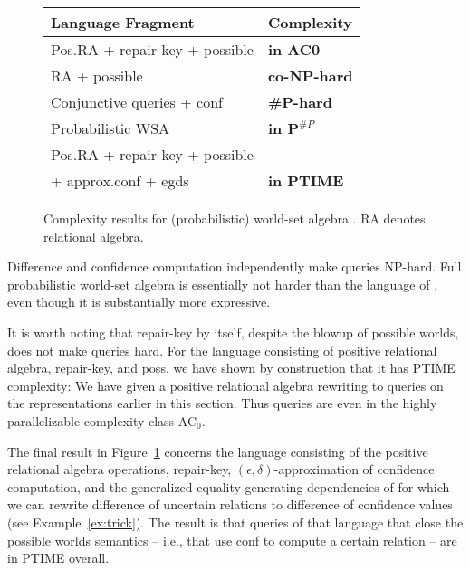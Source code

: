 \begin{figure}
\begin{center}
\begin{tabular}{|l|l|}
\hline
Language Fragment & Complexity \\
\hline
\hline
Pos.RA + repair-key + possible &
{\bf in AC0}
\\[.3ex]
RA + possible & {\bf co-NP-hard}
\\[.3ex]
Conjunctive queries + conf & {\bf \#P-hard}
\\[.3ex]
Probabilistic WSA & {\bf in ${\mathbf P^{\#P}}$}
\\[.5ex]
Pos.RA + repair-key + possible &
\\
+ approx.conf + egds &  {\bf in PTIME}
\\
\hline
\end{tabular}
\end{center}
%
\caption{Complexity results for (probabilistic) world-set algebra
\cite{KochBook2008}.
RA denotes relational algebra.}
\label{tab:complexity}
\end{figure}


Difference \cite{AKG1991} and confidence computation \cite{dalvi07efficient} independently make queries NP-hard.
Full probabilistic world-set algebra is essentially not harder than the language of \cite{dalvi07efficient}, even though it is substantially more expressive.

It is worth noting that repair-key by itself, despite the blowup of possible worlds, does not make queries hard. For the language consisting of positive relational algebra, repair-key, and poss, we have shown by construction that it has PTIME complexity: We have given a positive relational algebra rewriting to queries on the representations earlier in this section. Thus queries are even in the highly parallelizable complexity class AC$_0$.

The final result in Figure~\ref{tab:complexity} concerns the language consisting of the positive relational algebra operations, repair-key, $(\epsilon, \delta)$-approximation of confidence computation, and the generalized equality generating dependencies of \cite{Koch2008} for which we can rewrite difference of uncertain relations to difference of confidence values (see Example~\ref{ex:trick}). The result is that queries of that language that close the possible worlds semantics -- i.e., that use conf to compute a certain relation -- are in PTIME overall.
